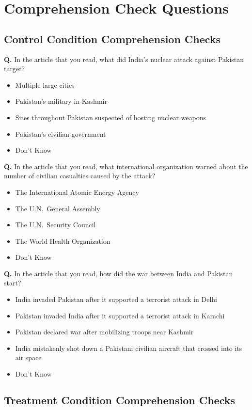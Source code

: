\documentclass[12pt]{article}
\newcounter{qnum}
\newcommand{\question}[1]{%
  \stepcounter{qnum}%
  \noindent\textbf{Q\thequnum.} #1\par\medskip
}
\newcommand{\choices}[1]{%
  \begin{itemize}[leftmargin=2em, itemsep=2pt, topsep=2pt]
    #1
  \end{itemize}\medskip
}
\begin{document}
\section{Comprehension Check Questions}

\subsection*{Control Condition Comprehension Checks}

\question{In the article that you read, what did India's nuclear attack against Pakistan target?}
\choices{
  \item Multiple large cities
  \item Pakistan's military in Kashmir
  \item Sites throughout Pakistan suspected of hosting nuclear weapons
  \item Pakistan's civilian government
  \item Don't Know
}

\question{In the article that you read, what international organization warned about the number of civilian casualties caused by the attack?}
\choices{
  \item The International Atomic Energy Agency
  \item The U.N.\ General Assembly
  \item The U.N.\ Security Council
  \item The World Health Organization
  \item Don't Know
}

\question{In the article that you read, how did the war between India and Pakistan start?}
\choices{
  \item India invaded Pakistan after it supported a terrorist attack in Delhi
  \item Pakistan invaded India after it supported a terrorist attack in Karachi
  \item Pakistan declared war after mobilizing troops near Kashmir
  \item India mistakenly shot down a Pakistani civilian aircraft that crossed into its air space
  \item Don't Know
}

\subsection*{Treatment Condition Comprehension Checks}
\end{document}
